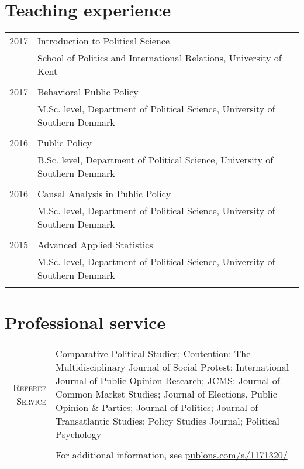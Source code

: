 \documentclass[a4paper,10pt]{article}
\begin{document}
\section{Teaching experience}
\begin{tabular}{r|p{11cm}}

2017 & Introduction to Political Science \\
& \footnotesize{School of Politics and International Relations, University of Kent} \\
\multicolumn{2}{c}{} \\

2017 & Behavioral Public Policy \\
& \footnotesize{M.Sc. level, Department of Political Science, University of Southern Denmark} \\
\multicolumn{2}{c}{} \\

2016 & Public Policy \\
& \footnotesize{B.Sc. level, Department of Political Science, University of Southern Denmark} \\
\multicolumn{2}{c}{} \\

2016 & Causal Analysis in Public Policy \\
& \footnotesize{M.Sc. level, Department of Political Science, University of Southern Denmark} \\
\multicolumn{2}{c}{} \\

2015 & Advanced Applied Statistics \\
& \footnotesize{M.Sc. level, Department of Political Science, University of Southern Denmark} \\
\multicolumn{2}{c}{} \\
\end{tabular}

\vspace{.7em}
\section{Professional service}
\begin{tabular}{r|p{11cm}}
\textsc{Referee Service} & Comparative Political Studies; Contention: The Multidisciplinary Journal of Social Protest; International Journal of Public Opinion Research; JCMS: Journal of Common Market Studies; Journal of Elections, Public Opinion \& Parties; Journal of Politics; Journal of Transatlantic Studies; Policy Studies Journal; Political Psychology \\
\multicolumn{2}{c}{} \\
 & For additional information, see \href{http://publons.com/a/1171320/}{publons.com/a/1171320/} \\

\end{tabular}
\end{document}
